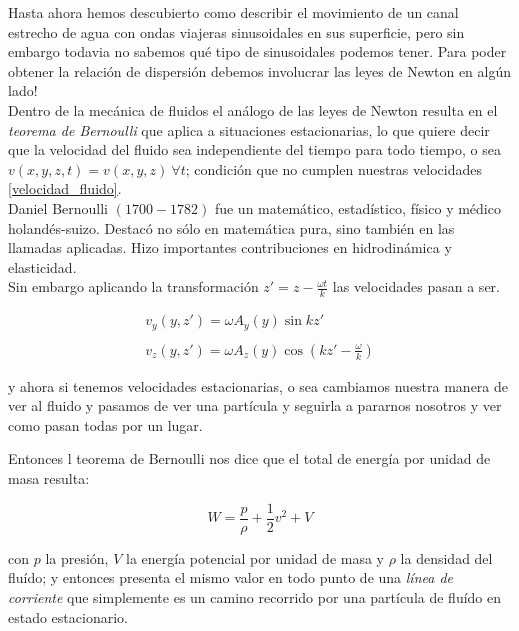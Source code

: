 \documentclass[a4paper,spanish]{article}
\numberwithin{equation}{section}
\begin{document}
Hasta ahora hemos descubierto  como describir el movimiento de un canal estrecho de agua con ondas viajeras sinusoidales en sus superficie, pero sin embargo todavia no sabemos qu\'e tipo de sinusoidales podemos tener. Para poder obtener la relaci\'on de dispersi\'on debemos involucrar las leyes de Newton en alg\'un lado!\\
Dentro de la mec\'anica de fluidos el an\'alogo de las leyes de Newton resulta en el \textit{teorema de Bernoulli} que aplica a situaciones estacionarias, lo que quiere decir que la velocidad del fluido sea independiente del tiempo para todo tiempo, o sea $v(x,y,z,t)=v(x,y,z) \ \forall t$; condici\'on que no cumplen nuestras velocidades \ref{velocidad_fluido}.
\\
Daniel Bernoulli $(1700 - 1782)$ fue un matem\'atico, estad\'istico, f\'isico y m\'edico holand\'es-suizo. Destac\'o no s\'olo en matem\'atica pura, sino tambi\'en en las llamadas aplicadas. Hizo importantes contribuciones en hidrodin\'amica y elasticidad.\\


Sin embargo aplicando la transformaci\'on $z'=z-\frac{\omega t}{k}$ las velocidades pasan a ser.

\begin{equation}
\begin{array}{c}
v_y(y,z')= \omega A_y(y)\sin{kz'} \\
\\
v_z(y,z')= \omega A_z(y)\cos{(kz'-\frac{\omega}{k})}
\end{array} 
\label{velocidad_fluido_nueva}
\end{equation}

y ahora si tenemos velocidades estacionarias, o sea cambiamos nuestra manera de ver al fluido y pasamos de ver una part\'icula y seguirla a pararnos nosotros y ver como pasan todas por un lugar.

Entonces l teorema de Bernoulli nos dice que el total de energ\'ia por unidad de masa resulta:

\begin{equation}
W=\frac{p}{\rho}+\frac{1}{2}v^2+V
\label{bernoulli}
\end{equation}

con $p$ la presi\'on, $V$ la energ\'ia potencial por unidad de masa y $\rho$ la densidad del flu\'ido; y entonces presenta el mismo valor en todo punto de una \textit{l\'inea de corriente} que simplemente es un camino recorrido por una part\'icula de flu\'ido en estado estacionario.
\end{document}
